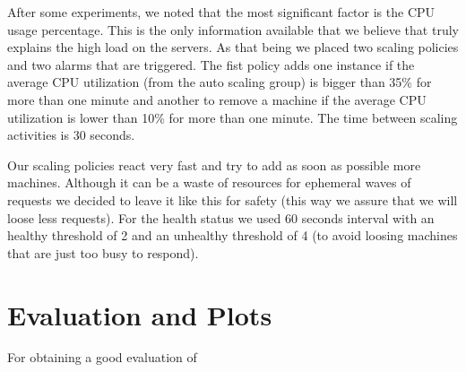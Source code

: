 \documentclass{article}
\begin{document}
After some experiments, we noted that the most significant factor is the CPU usage percentage. This is the only information available that we believe that truly explains the high load on the servers. As that being we placed two scaling policies and two alarms that are triggered. The fist policy adds one instance if the average CPU utilization (from the auto scaling group) is bigger than 35\% for more than one minute and another to remove a machine if the average CPU utilization is lower than 10\% for more than one minute. The time between scaling activities is 30 seconds.

Our scaling policies react very fast and try to add as soon as possible more machines. Although it can be a waste of resources for ephemeral waves of requests we decided to leave it like this for safety (this way we assure that we will loose less requests). For the health status we used 60 seconds interval with an healthy threshold of 2 and an unhealthy threshold of 4 (to avoid loosing machines that are just too busy to respond). 

\section{Evaluation and Plots}
For obtaining a good evaluation of 
\end{document}
